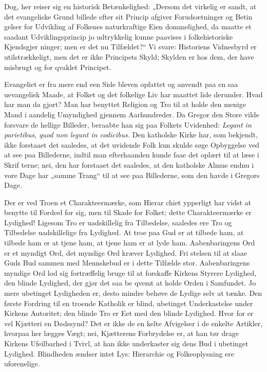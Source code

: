 \documentclass[12pt]{book}
\newcommand{\opage}[1]{\marginnote{\footnotesize\textit{[#1]}}}
\begin{document}
Dog, her reiser sig en historisk Betænkelighed:
„Dersom det virkelig er sandt, at det evangeliske Grund\-%
billede efter sit Princip afgiver Forudsætninger og Betin\-%
gelser for Udvikling af Folkenes naturkraftige Eien\-%
dommelighed, da maatte et saadant Udviklingsprincip jo
\opage{124}\setcounter{footnote}{0}%
udtrykkelig kunne paavises i folkehistoriske Kjendsgjer\-%
ninger; men er det nu Tilfældet?“ Vi svare: Historiens
Vidnesbyrd er utilstrækkeligt, men det er ikke Principets
Skyld; Skylden er hos dem, der have misbrugt og for\-%
qvaklet Principet.

Evangeliet er fra mere end een Side bleven opfattet
og anvendt paa en saa uevangelisk Maade, at Folket og
det folkelige Liv har maattet lide derunder. Hvad har
man da gjort? Man har benyttet Religion og Tro til at
holde den menige Mand i aandelig Umyndighed gjennem
Aarhundreder. Da Gregor den Store vilde forsvare de
hellige Billeder, beraabte han sig paa Folkets Uvidenhed:
\textit{Legant in parietibus, quod non legunt in codicibus.} Den
katholske Kirke har, som bekjendt, ikke forstaaet
det saaledes, at det uvidende Folk kun skulde søge
Opbyggelse ved at see paa Billederne, indtil man
efterhaanden kunde faae det oplært til at læse i Skrif\-%
terne; nei, den har forstaaet det saaledes, at den katholske
Almue endnu i vore Dage har „samme Trang“ til at see
paa Billederne, som den havde i Gregors Dage.

Der er ved Troen et Charakteermærke, som Hierar\-%
chiet ypperligt har vidst at benytte til Fordeel for sig, men
til Skade for Folket; dette Charakteermærke er Lydighed!
Ligesom Tro er uadskillelig fra Tilbedelse, saaledes ere
Tro og Tilbedelse uadskillelige fra Lydighed. At troe paa
Gud er at tilbede ham, at tilbede ham er at tjene ham,
at tjene ham er at lyde ham. Aabenbaringens Ord er et
myndigt Ord, det myndige Ord kræver Lydighed. Fri\-%
stelsen til at slaae Guds Bud sammen med Mennskebud
er i dette Tilfælde stor. Aabenbaringens myndige Ord lod
sig fortræffelig bruge til at forskaffe Kirkens Styrere
Lydighed, den blinde Lydighed, der gjør det saa be\-%
qvemt at holde Orden i Samfundet. Jo mere ubetinget
Lydigheden er, desto mindre behøve de Lydige selv at
\opage{125}\setcounter{footnote}{0}%
tænke. Den første Fordring til en troende Katholik er
blind, ubetinget Underkastelse under Kirkens Autoritet;
den blinde Tro er Eet med den blinde Lydighed. Hvor\-%
for er vel Kjætteri en Dødssynd? Det er ikke de en\-%
kelte Afvigelser i de enkelte Artikler, hvorpaa her lægges
Vægt; nei, Kjætterens Forbrydelse er, at han tør drage
Kirkens Ufeilbarhed i Tvivl, at han ikke underkaster
sig dens Bud i ubetinget Lydighed. Blindheden ændser
intet Lys: Hierarchie og Folkeoplysning ere uforenelige.
\end{document}
